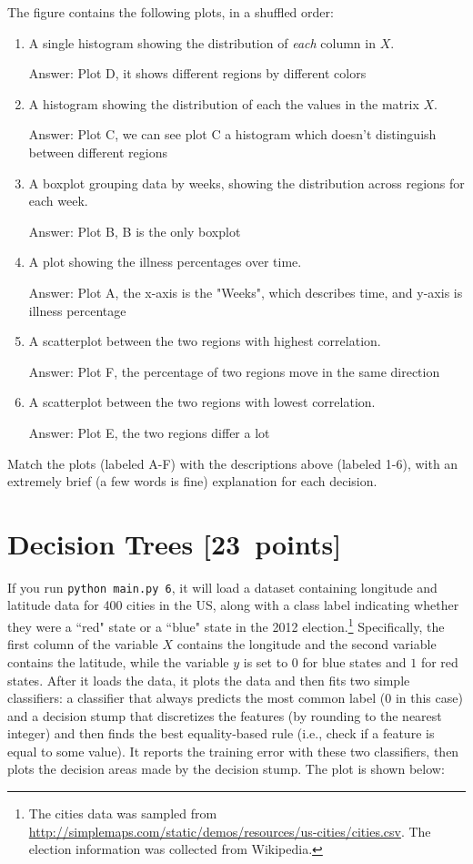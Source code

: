 \documentclass{article}
\newcommand{\blu}[1]{{\textcolor{blu}{#1}}}
\newcommand{\gre}[1]{\textcolor{gre}{#1}}
\newcommand\ans[1]{\par\gre{Answer: #1}}
\let\ask\blu
\newcommand\pts[1]{\textcolor{pointscolour}{[#1~points]}}
\begin{document}
  The figure contains the following plots, in a shuffled order:
  \begin{enumerate}
  \item A single histogram showing the distribution of \emph{each} column in $X$.
  \ans{Plot D, it shows different regions by different colors}
  \item A histogram showing the distribution of each the values in the matrix $X$.
  \ans{Plot C, we can see plot C a histogram which doesn't distinguish between different regions}
  \item A boxplot grouping data by weeks, showing the distribution across regions for each week.
  \ans{Plot B, B is the only boxplot}
  \item A plot showing the illness percentages over time.
  \ans{Plot A, the x-axis is the "Weeks", which describes time, and y-axis is illness percentage}
  \item A scatterplot between the two regions with highest correlation.
  \ans{Plot F, the percentage of two regions move in the same direction}
  \item A scatterplot between the two regions with lowest correlation.
  \ans{Plot E, the two regions differ a lot}
  \end{enumerate}

  \ask{Match the plots (labeled A-F) with the descriptions above (labeled 1-6), with an extremely brief (a few words is fine) explanation for each decision.}





  \clearpage\section{Decision Trees \pts{23}}

  If you run \texttt{python main.py 6}, it will load a dataset containing longitude
  and latitude data for 400 cities in the US, along with a class label indicating
  whether they were a ``red" state or a ``blue" state in the 2012
  election.\footnote{The cities data was sampled from \url{http://simplemaps.com/static/demos/resources/us-cities/cities.csv}. The election information was collected from Wikipedia.}
  Specifically, the first column of the variable $X$ contains the
  longitude and the second variable contains the latitude,
  while the variable $y$ is set to $0$ for blue states and $1$ for red states.
  After it loads the data, it plots the data and then fits two simple
  classifiers: a classifier that always predicts the
  most common label ($0$ in this case) and a decision stump
  that discretizes the features (by rounding to the nearest integer)
  and then finds the best equality-based rule (i.e., check
  if a feature is equal to some value).
  It reports the training error with these two classifiers, then plots the decision areas made by the decision stump.
  The plot is shown below:
\end{document}

